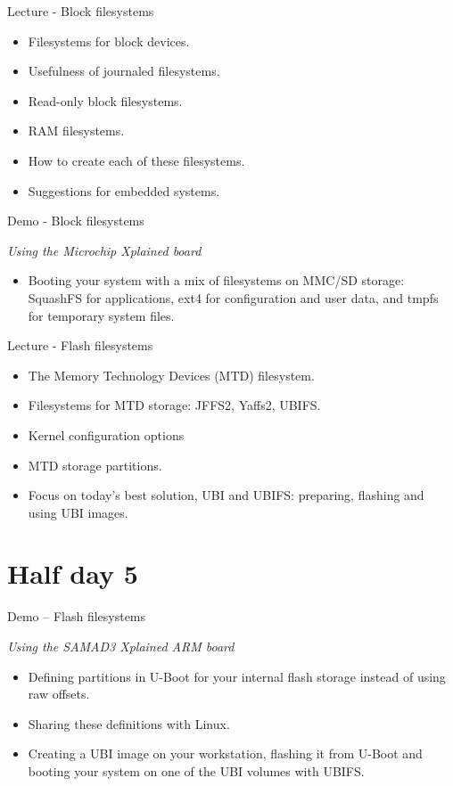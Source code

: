 \documentclass[a4paper,12pt,obeyspaces,spaces,hyphens]{article}
\begin{document}
\feagendatwocolumn
{Lecture - Block filesystems}
{
  \begin{itemize}
  \item Filesystems for block devices.
  \item Usefulness of journaled filesystems.
  \item Read-only block filesystems.
  \item RAM filesystems.
  \item How to create each of these filesystems.
  \item Suggestions for embedded systems.
  \end{itemize}
}
{Demo - Block filesystems}
{
  {\em Using the Microchip Xplained board}
  \begin{itemize}
  \item Booting your system with a mix of filesystems on MMC/SD storage: SquashFS for
	applications, ext4 for configuration and user data, and
	tmpfs for temporary system files.
  \end{itemize}
}

\feagendaonecolumn
{Lecture - Flash filesystems}
{
  \begin{itemize}
  \item The Memory Technology Devices (MTD) filesystem.
  \item Filesystems for MTD storage: JFFS2, Yaffs2, UBIFS.
  \item Kernel configuration options
  \item MTD storage partitions.
  \item Focus on today's best solution, UBI and UBIFS:
	preparing, flashing and using UBI images.
  \end{itemize}
}

\section{Half day 5}

\feagendaonecolumn
{Demo – Flash filesystems}
{
  {\em Using the SAMAD3 Xplained ARM board}
  \begin{itemize}
  \item Defining partitions in U-Boot for your internal
        flash storage instead of using raw offsets.
  \item Sharing these definitions with Linux.
  \item Creating a UBI image on your workstation, flashing
        it from U-Boot and booting your system on one of
        the UBI volumes with UBIFS.
  \end{itemize}
}
\end{document}
